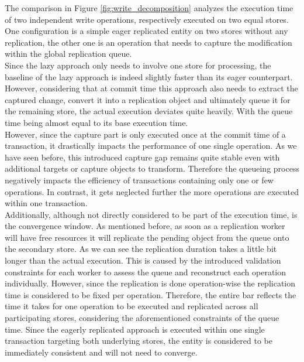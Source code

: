 The comparison in Figure \ref{fig:write_decomposition} analyzes the execution time of two independent write operations, respectively executed on two equal stores.
One configuration is a simple eager replicated entity on two stores without any replication, the other one is an operation that needs to capture 
the modification within the global replication queue.\\
Since the lazy approach only needs to involve one store for processing, the baseline of the lazy approach is indeed slightly faster than its eager counterpart.
However, considering that at commit time this approach also needs to extract the captured change, convert it into a replication object and ultimately queue 
it for the remaining store, the actual execution deviates quite heavily. With the queue time being almost equal to its base execution time.\\
However, since the capture part is only executed once at the commit time of a transaction, it drastically impacts the performance 
of one single operation.
As we have seen before, this introduced capture gap remains quite stable even with additional targets or capture objects to transform.
Therefore the queueing process negatively impacts the efficiency of transactions containing only one or few operations.
In contrast, it gets neglected further the more operations are executed within one transaction.\\
Additionally, although not directly considered to be part of the execution time, is the convergence window. As mentioned before, as soon
as a replication worker will have free resources it will replicate the pending object from the queue onto the secondary store.
As we can see the replication duration takes a little bit longer than the actual execution. This is caused by the introduced
validation constraints for each worker to assess the queue and reconstruct each operation individually. 
However, since the replication is done operation-wise the replication time is considered to be fixed per operation.
Therefore, the entire bar reflects the time it takes for one operation to be executed and replicated across all participating stores,
considering the aforementioned constraints of the queue time.
Since the eagerly replicated approach is executed within one single transaction targeting both underlying stores, the entity is 
considered to be immediately consistent and will not need to converge. 








